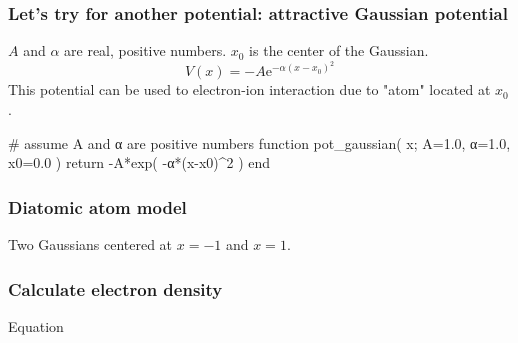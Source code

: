\begin{frame}[fragile]
\frametitle{Let's try for another potential: attractive Gaussian potential}

$A$ and $\alpha$ are real, positive numbers.
$x_0$ is the center of the Gaussian.
\begin{equation*}
V(x) = -A \mathrm{e}^{-\alpha (x - x_0)^2}
\end{equation*}
This potential can be used to electron-ion interaction due to "atom" located
at $x_0$.

\begin{juliacode}
# assume A and α are positive numbers
function pot_gaussian( x; A=1.0, α=1.0, x0=0.0 )
    return -A*exp( -α*(x-x0)^2 )
end
\end{juliacode}

\end{frame}


\begin{frame}
\frametitle{Diatomic atom model}

Two Gaussians centered at $x = -1$ and $x = 1$.

\end{frame}



\begin{frame}
\frametitle{Calculate electron density}

Equation

\end{frame}







